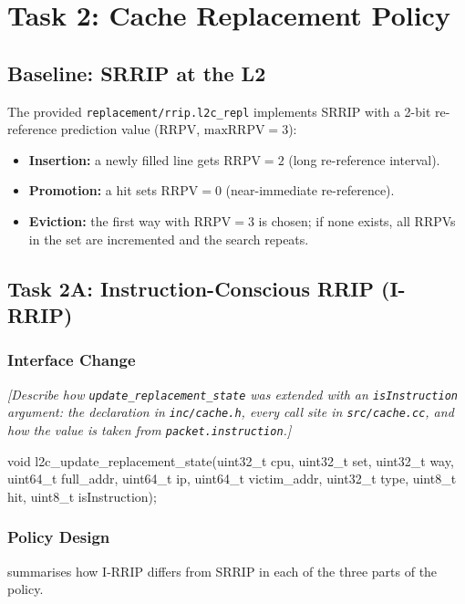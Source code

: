 \documentclass[11pt,a4paper]{article}
\theoremstyle{themethm}
\theoremstyle{themedef}
\theoremstyle{themeex}
\theoremstyle{themerem}
\newcommand{\todo}[1]{\textcolor{black!55}{\textit{[#1]}}}
\begin{document}
\section{Task 2: Cache Replacement Policy}\label{sec:task2}

\subsection{Baseline: SRRIP at the L2}\label{sec:rrip}
The provided \texttt{replacement/rrip.l2c\_repl} implements SRRIP with a
2-bit re-reference prediction value (RRPV, $\text{maxRRPV}=3$):
\begin{itemize}
  \item \textbf{Insertion:} a newly filled line gets $\text{RRPV}=2$ (long re-reference interval).
  \item \textbf{Promotion:} a hit sets $\text{RRPV}=0$ (near-immediate re-reference).
  \item \textbf{Eviction:} the first way with $\text{RRPV}=3$ is chosen; if none exists, all RRPVs in the set are incremented and the search repeats.
\end{itemize}

\subsection{Task 2A: Instruction-Conscious RRIP (I-RRIP)}\label{sec:task2a}

\subsubsection{Interface Change}\label{sec:irrip-interface}
\todo{Describe how \texttt{update\_replacement\_state} was extended with an \texttt{isInstruction} argument: the declaration in \texttt{inc/cache.h}, every call site in \texttt{src/cache.cc}, and how the value is taken from \texttt{packet.instruction}.}

\begin{cppcode}
void l2c_update_replacement_state(uint32_t cpu, uint32_t set, uint32_t way,
        uint64_t full_addr, uint64_t ip, uint64_t victim_addr,
        uint32_t type, uint8_t hit, uint8_t isInstruction);
\end{cppcode}

\subsubsection{Policy Design}\label{sec:irrip-design}
 summarises how I-RRIP differs from SRRIP in each
of the three parts of the policy.
\end{document}
